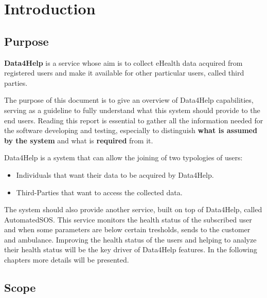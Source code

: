 
\chapter{Introduction}
\section{Purpose}

\textbf{Data4Help} is a service whose aim is to collect eHealth data acquired from registered users and make it available for other particular users, called third parties.

\par \noindent \newline
The purpose of this document is to give an overview of Data4Help capabilities, serving as a guideline to fully understand what this system should provide to the end users. Reading this report
is essential to gather all the information needed for the software developing and testing, especially to distinguish  \textbf{what is assumed by the system} and what is \textbf{required} from it.

\par \noindent \newline
Data4Help is a system that can allow the joining of two typologies of users:
\begin{itemize}
\item Individuals that want their data to be acquired by Data4Help.
\item Third-Parties that want to access the collected data.
\end{itemize}
The system should also provide another service, built on top of Data4Help, called AutomatedSOS.
\newline
 This service monitors the health status of the subscribed user and when some parameters are below certain tresholds, sends to the customer and ambulance.
\newline
Improving the health status of the users and helping to analyze their health status will be the key driver of Data4Help features.
\newline
In the following chapters more details will be presented.
\section{Scope}
